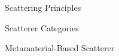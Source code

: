 \documentclass[journal]{IEEEtran}
\begin{document}
\begin{section}{Scattering Principles}
\begin{subsection}{Scatterer Categories}
\begin{subsubsection}{Metamaterial-Based Scatterer}




\end{subsubsection}
\end{subsection}
\end{section}
\end{document}
